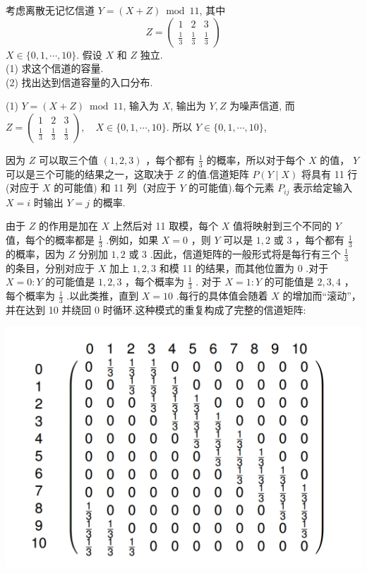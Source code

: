 \begin{tcolorbox}[breakable,colback=blue!5!white,colframe=blue!75!black,
 title= 解答题]

考虑离散无记忆信道 $ Y=(X+Z) \bmod 11 $, 其中
$$
Z=\left(\begin{array}{ccc}
1 & 2 & 3 \\
\frac1 3 & \frac1 3 &\frac1 3
\end{array}\right)
$$
$ X \in\{0,1, \cdots, 10\} $. 假设 $ X $ 和 $ Z $ 独立.\\
(1) 求这个信道的容量.\\
(2) 找出达到信道容量的入口分布.
\tcblower

(1) $ Y=(X+Z) \bmod 11 $, 输入为 $ X $, 输出为 $ Y, Z $ 为噪声信道, 而
$
Z=\left(\begin{array}{ccc}
1 & 2 & 3 \\
\frac1 3 & \frac1 3 & \frac1  3
\end{array}\right), \quad X \in\{0,1, \cdots, 10\}.
$
所以 $ Y \in\{0,1, \cdots, 10\} $, 

因为 $ Z $ 可以取三个值 $ (1,2,3) $ ，每个都有 $ \frac{1}{3} $ 的概率，所以对于每个 $ X $ 的值， $ Y $ 可以是三个可能的结果之一，这取决于 $ Z $ 的值.信道矩阵 $ P(Y \mid X) $ 将具有 11 行 (对应于 $ X $ 的可能值) 和 11 列（对应于 $ Y $ 的可能值).每个元素 $ P_{i j} $ 表示给定输入 $ X=i $ 时输出 $ Y=j $ 的概率.

由于 $ Z $ 的作用是加在 $ X $ 上然后对 11 取模，每个 $ X $ 值将映射到三个不同的 $ Y $ 值，每个的概率都是 $ \frac{1}{3} $ .例如，如果 $ X=0 $ ，则 $ Y $ 可以是 $ 1 , 2 $ 或 3 ，每个都有 $ \frac{1}{3} $ 的概率，因为 $ Z $ 分别加 $ 1 , 2 $ 或 3 .因此，信道矩阵的一般形式将是每行有三个 $ \frac{1}{3} $ 的条目，分别对应于 $ X $ 加上 $ 1 , 2 , 3 $ 和模 11 的结果，而其他位置为 0 .对于 $ X=0: Y $ 的可能值是 $ 1,2,3 $ ，每个概率为 $ \frac{1}{3} $ . 对于 $ X=1: Y $ 的可能值是 $ 2,3,4 $ ，每个概率为 $ \frac{1}{3} $ .以此类推，直到 $ X=10 $ .每行的具体值会随着 $ X $ 的增加而“滚动”，并在达到 10 并绕回 0 时循环.这种模式的重复构成了完整的信道矩阵:

\begin{center}
     \includegraphics[width=0.4\linewidth]{2.png}
\end{center}


\end{tcolorbox}

